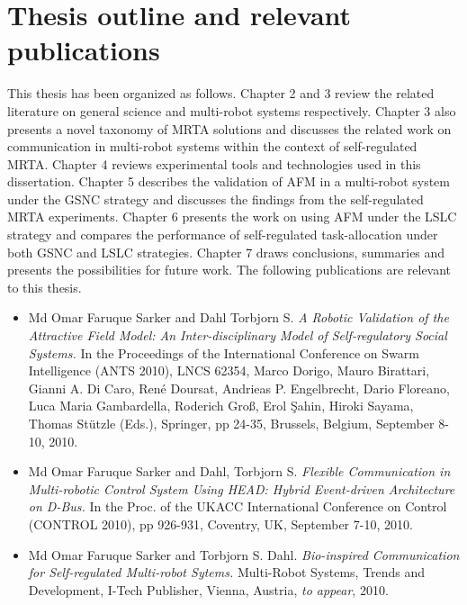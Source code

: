 \section{Thesis outline and relevant publications}
This thesis has been organized as follows.
Chapter 2 and 3 review the related literature on general science and multi-robot systems respectively. Chapter 3 also presents a novel taxonomy of MRTA solutions and discusses the related work on communication in multi-robot systems within the context of self-regulated MRTA.
Chapter 4 reviews experimental tools and technologies used in this dissertation.
Chapter 5 describes the validation of AFM in a multi-robot system under the GSNC strategy and discusses the findings from the self-regulated MRTA experiments.
Chapter 6 presents the work on using AFM under the LSLC strategy and compares the performance of self-regulated task-allocation under both GSNC and LSLC strategies.
Chapter 7 draws conclusions, summaries and presents the possibilities for future work.
The following publications are relevant to this thesis.
\begin{itemize}
\item Md Omar Faruque Sarker and Dahl Torbjorn S. \textit{A Robotic Validation of the Attractive Field Model: An Inter-disciplinary Model of Self-regulatory Social Systems.} In the Proceedings of the International Conference on Swarm Intelligence (ANTS 2010), LNCS 62354, Marco Dorigo, Mauro Birattari, Gianni A. Di Caro, René Doursat, Andrieas P. Engelbrecht, Dario Floreano, Luca Maria Gambardella, Roderich Groß, Erol Şahin, Hiroki Sayama, Thomas Stützle (Eds.), Springer, pp 24-35, Brussels, Belgium, September 8-10, 2010.
\item Md Omar Faruque Sarker and Dahl, Torbjorn S. \textit{Flexible Communication in Multi-robotic Control System Using HEAD: Hybrid Event-driven Architecture on D-Bus.} In the Proc. of the UKACC International Conference on Control (CONTROL 2010),  pp 926-931, Coventry, UK, September 7-10, 2010.
\item Md Omar Faruque Sarker and Torbjorn S. Dahl. \textit{Bio-inspired Communication for Self-regulated Multi-robot Sytems.}  Multi-Robot Systems, Trends and Development, I-Tech Publisher, Vienna, Austria, \textit{to appear}, 2010.
\end{itemize}